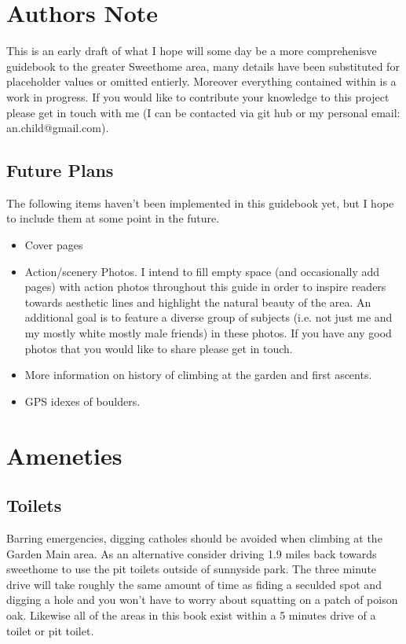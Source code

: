 \section{Authors Note}
This is an early draft of what I hope will some day be a more comprehenisve guidebook to the greater Sweethome area, many details have been substituted for placeholder values or omitted entierly. Moreover everything contained within is a work in progress. If you would like to contribute your knowledge to this project please get in touch with me (I can be contacted via git hub or my personal email: an.child@gmail.com).
\subsection*{Future Plans}
The following items haven't been implemented in this guidebook yet, but I hope to include them at some point in the future.
\begin{itemize}
\item Cover pages\\
\item Action/scenery Photos. I intend to fill empty space (and occasionally add pages) with action photos throughout this guide in order to inspire readers towards aesthetic lines and highlight the natural beauty of the area. An additional goal is to feature a diverse group of subjects (i.e. not just me and my mostly white mostly male friends) in these photos. If you have any good photos that you would like to share please get in touch.\\
\item More information on history of climbing at the garden and first ascents.\\
\item GPS idexes of boulders.\\
\end{itemize}
\section{Ameneties}
\subsection*{Toilets}
Barring emergencies, digging catholes should be avoided when climbing at the Garden Main area. As an alternative consider driving 1.9 miles back towards sweethome to use the pit toilets outside of sunnyside park. The three minute drive will take roughly the same amount of time as fiding a seculded spot and digging a hole and you won't have to worry about squatting on a patch of poison oak. Likewise all of the areas in this book exist within a 5 minutes drive of a toilet or pit toilet. 
